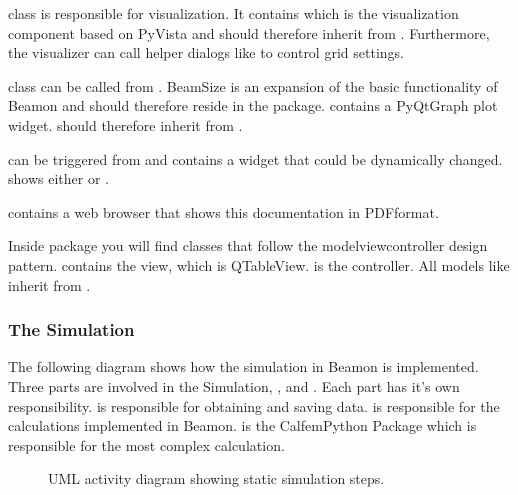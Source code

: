 \documentclass[letterpaper,10pt,english]{sphinxmanual}
\begin{document}
 class is responsible for visualization. It contains  which is the visualization
component based on PyVista and should therefore inherit from .
Furthermore, the visualizer can call helper dialogs like  to control grid settings.

 class can be called from . BeamSize is an expansion of the basic functionality of Beamon and
should therefore reside in the  package.  contains a PyQtGraph plot widget. 
should therefore inherit from .

 can be triggered from  and contains a widget that could be dynamically changed. 
shows either  or .

 contains a web browser that shows this documentation in PDF\sphinxhyphen{}format.

Inside  package you will find classes that follow the model\sphinxhyphen{}view\sphinxhyphen{}controller design pattern. 
contains the view, which is QTableView.  is the controller. All models like  inherit
from .


\subsubsection{The Simulation}
\label{\detokenize{implementation:the-simulation}}
The following diagram shows how the simulation in Beamon is implemented. Three parts are involved in the Simulation,
,  and . Each part has it’s own responsibility.  is responsible for obtaining and
saving data.  is responsible for the calculations implemented in Beamon.  is the Calfem\sphinxhyphen{}Python Package
which is responsible for the most complex calculation.

\begin{figure}[htbp]
\centering
\capstart

\noindent{}
\caption{UML activity diagram showing static simulation steps.}\label{\detokenize{implementation:id4}}\end{figure}
\end{document}
